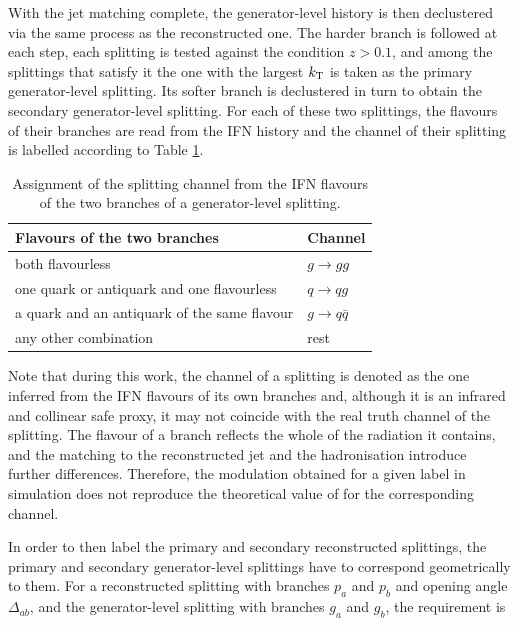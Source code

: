 With the jet matching complete, the generator-level history is then declustered via the same
process as the reconstructed one. The harder branch is followed at each step, each
splitting is tested against the condition $z > 0.1$, and among the splittings that
satisfy it the one with the largest $k_{\mathrm{T}}$ is taken as the primary generator-level
splitting. Its softer branch is declustered in turn to obtain the secondary
generator-level splitting. For each of these two splittings, the flavours of their branches
are read from the IFN history and the channel of their splitting is labelled according to 
Table \ref{tab:channels}.

\begin{table}[htbp]
  \centering
  \caption{Assignment of the splitting channel from the IFN flavours of the two
  branches of a generator-level splitting.}
  \label{tab:channels}
  \begin{tabular}{ll}
    \toprule
    Flavours of the two branches & Channel \\
    \midrule
    both flavourless                                   & $g \to gg$ \\
    one quark or antiquark and one flavourless         & $q \to qg$ \\
    a quark and an antiquark of the same flavour       & $g \to q\bar{q}$ \\
    any other combination                              & rest \\
    \bottomrule
  \end{tabular}
\end{table}

Note that during this work, the channel of a splitting is denoted as the one inferred from the
IFN flavours of its own branches and, although it is an infrared and collinear safe
proxy, it may not coincide with the real truth channel of the splitting.
The flavour of a branch reflects
the whole of the radiation it contains, and the matching to the reconstructed jet
and the hadronisation introduce further differences. Therefore, the modulation obtained for a
given label in simulation does not reproduce the theoretical value of \cite{Karlberg_2021} 
for the corresponding channel.

In order to then label the primary and secondary reconstructed splittings, 
the primary and secondary generator-level splittings have to correspond geometrically to them.
For a reconstructed splitting with branches $p_a$
and $p_b$ and opening angle $\Delta_{ab}$, and the generator-level splitting with
branches $g_a$ and $g_b$, the requirement is

